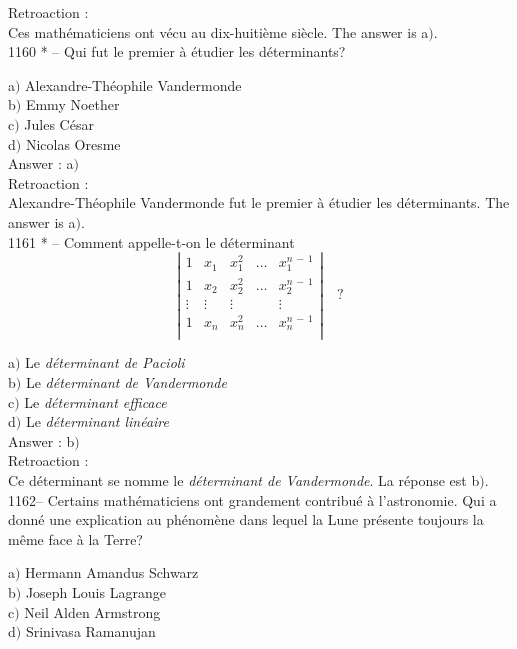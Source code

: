 ﻿\documentclass[letterpaper, 12pt]{article}
\begin{document}
Retroaction : \\
Ces math\'ematiciens ont v\'ecu au dix-huiti\`eme si\`ecle. The answer is
a$)$.\\

1160 * -- Qui fut le premier \`a \'etudier les d\'eterminants?

a$)$ Alexandre-Th\'eophile Vandermonde \\
b$)$ Emmy Noether \\
c$)$ Jules C\'esar \\
d$)$ Nicolas Oresme   \\

Answer : a$)$\\

Retroaction : \\
Alexandre-Th\'eophile Vandermonde fut le premier \`a \'etudier les
d\'eterminants. The answer is a$)$.\\

1161 * -- Comment appelle-t-on le d\'eterminant
$$\left|\begin{matrix}
1      & x_1 & x_1^2 & \ldots & x_1^{n\,-\,1} \\
1      & x_2 & x_2^2 & \ldots & x_2^{n\,-\,1} \\
\vdots &\vdots &\vdots &      & \vdots    \\
1      & x_n & x_n^2 & \ldots & x_n^{n\,-\,1} \\
\end{matrix}\right|\quad?$$

a$)$ Le {\sl d\'eterminant de Pacioli} \\
b$)$ Le {\sl d\'eterminant de Vandermonde} \\
c$)$ Le {\sl d\'eterminant efficace} \\
d$)$ Le {\sl d\'eterminant lin\'eaire}  \\

Answer : b$)$\\

Retroaction : \\
Ce d\'eterminant se nomme le {\sl d\'eterminant de Vandermonde}. La
r\'eponse est b$)$.\\

1162-- Certains math\'ematiciens ont grandement contribu\'e \`a
l'astronomie. Qui a donn\'e une explication au ph\'enom\`ene dans
lequel la Lune pr\'esente toujours la m\^eme face \`a la Terre?

a$)$ Hermann Amandus Schwarz \\
b$)$ Joseph Louis Lagrange \\
c$)$ Neil Alden Armstrong \\
d$)$ Srinivasa Ramanujan\\
\end{document}
